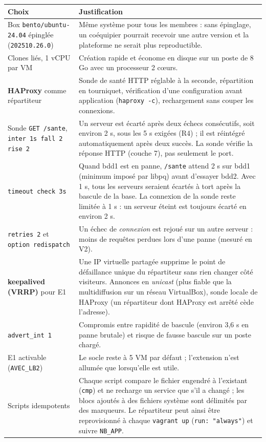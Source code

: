 \documentclass[11pt,a4paper,oneside]{report}
\newcommand{\cmd}[1]{\texttt{#1}}
\begin{document}
	\begin{longtable}{@{}p{} p{}@{}}
		\toprule
		\textbf{Choix} & \textbf{Justification} \\
		\midrule
		\endhead
		Box \cmd{bento/ubuntu-24.04} épinglée (\cmd{202510.26.0}) & Même système pour tous les membres : sans épinglage, un coéquipier pourrait recevoir une autre version et la plateforme ne serait plus reproductible. \\
		\addlinespace
		Clones liés, 1 vCPU par VM & Création rapide et économe en disque sur un poste de 8 Go avec un processeur 2 cœurs. \\
		\addlinespace
		\textbf{HAProxy} comme répartiteur & Sonde de santé HTTP réglable à la seconde, répartition en tourniquet, vérification d'une configuration avant application (\cmd{haproxy -c}), rechargement sans couper les connexions. \\
		\addlinespace
		Sonde \cmd{GET /sante}, \cmd{inter 1s fall 2 rise 2} & Un serveur est écarté après deux échecs consécutifs, soit environ 2 s, sous les 5 s exigées (R4) ; il est réintégré automatiquement après deux succès. La sonde vérifie la réponse HTTP (couche 7), pas seulement le port. \\
		\addlinespace
		\cmd{timeout check 3s} & Quand bdd1 est en panne, \cmd{/sante} attend 2 s sur bdd1 (minimum imposé par libpq) avant d'essayer bdd2. Avec 1 s, tous les serveurs seraient écartés à tort après la bascule de la base. La connexion de la sonde reste limitée à 1 s : un serveur éteint est toujours écarté en environ 2 s. \\
		\addlinespace
		\cmd{retries 2} et \cmd{option redispatch} & Un échec de \emph{connexion} est rejoué sur un autre serveur : moins de requêtes perdues lors d'une panne (mesuré en V2). \\
		\addlinespace
		\textbf{keepalived (VRRP)} pour E1 & Une IP virtuelle partagée supprime le point de défaillance unique du répartiteur sans rien changer côté visiteurs. Annonces en \emph{unicast} (plus fiable que la multidiffusion sur un réseau VirtualBox), sonde locale de HAProxy (un répartiteur dont HAProxy est arrêté cède l'adresse). \\
		\addlinespace
		\cmd{advert\_int 1} & Compromis entre rapidité de bascule (environ 3,6 s en panne brutale) et risque de fausse bascule sur un poste chargé. \\
		\addlinespace
		E1 activable (\cmd{AVEC\_LB2}) & Le socle reste à 5 VM par défaut ; l'extension n'est allumée que lorsqu'elle est utile. \\
		\addlinespace
		Scripts idempotents & Chaque script compare le fichier engendré à l'existant (\cmd{cmp}) et ne recharge un service que s'il a changé ; les blocs ajoutés à des fichiers système sont délimités par des marqueurs. Le répartiteur peut ainsi être reprovisionné à chaque \cmd{vagrant up} (\cmd{run: "always"}) et suivre \cmd{NB\_APP}. \\
		\bottomrule
	\end{longtable}
	
\end{document}
